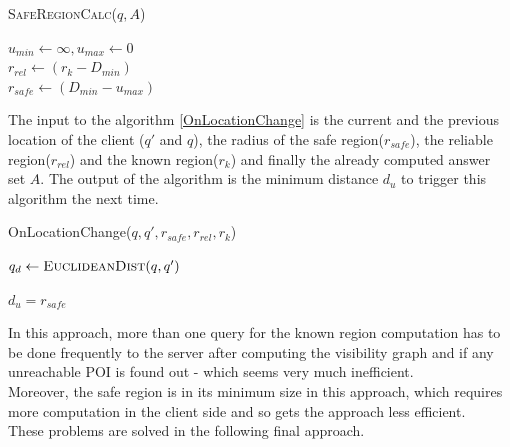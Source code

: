 \documentclass{sig-alternate}
\begin{document}
\begin{algorithm}
\caption{\textsc{SafeRegionCalc}($q,A$)}
\label{SafeRegionCalc}
    
	
	 $u_{min} \gets \infty, u_{max} \gets 0$ \\
	 $r_{rel} \gets ( r_k - D_{min} )$\\
	 \Return $r_{safe} \gets (D_{min}-u_{max})$ 
\end{algorithm}

The input to the algorithm \ref{OnLocationChange} is the current and the previous location of the client ($q'$ and $q$), the radius of the safe region($r_{safe}$), the reliable region($r_{rel}$) and the known region($r_{k}$) and finally the already computed answer set $A$. The output of the algorithm is the minimum distance $d_u$ to trigger this algorithm the next time.

\begin{algorithm}
\caption{OnLocationChange($q, q', r_{safe}, r_{rel}, r_k$)}
\label{OnLocationChange}
    
    $q_d \gets \textsc{EuclideanDist}(q, q')$
    
    
    \Return $d_u = r_{safe}$
\end{algorithm}

In this approach, more than one query for the known region computation has to be done frequently to the server after computing the visibility graph and if any unreachable POI is found out - which seems very much inefficient.
\\ Moreover, the safe region is in its minimum size in this approach, which requires more computation in the client side and so gets the approach less efficient.
\\ These problems are solved in the following final approach.
\end{document}
